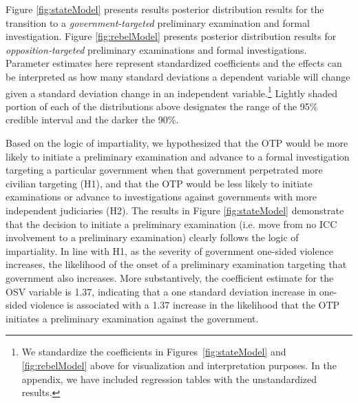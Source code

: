 Figure \ref{fig:stateModel} presents results posterior distribution results for the transition to a \textit{government-targeted} preliminary examination and formal investigation. Figure \ref{fig:rebelModel} presents posterior distribution results for \textit{opposition-targeted} preliminary examinations and formal investigations. Parameter estimates here represent standardized coefficients and the effects can be interpreted as how many standard deviations a dependent variable will change given a standard deviation change in an independent variable.\footnote{We standardize the coefficients in Figures~\ref{fig:stateModel} and \ref{fig:rebelModel} above for visualization and interpretation purposes. In the appendix, we have included regression tables with the unstandardized results.} Lightly shaded portion of each of the distributions above designates the range of the 95\% credible interval and the darker the 90\%.

Based on the logic of impartiality, we hypothesized that the OTP would be more likely to initiate a preliminary examination and advance to a formal investigation targeting a particular government when that government perpetrated more civilian targeting (H1), and that the OTP would be less likely to initiate examinations or advance to investigations against governments with more independent judiciaries (H2). The results in Figure \ref{fig:stateModel} demonstrate that the decision to initiate a preliminary examination (i.e. move from no ICC involvement to a preliminary examination) clearly follows the logic of impartiality. In line with H1, as the severity of government one-sided violence increases, the likelihood of the onset of a preliminary examination targeting that government also increases.  More substantively, the coefficient estimate for the OSV variable is 1.37, indicating that a one standard deviation increase in one-sided violence is associated with a 1.37 increase in the likelihood that the OTP initiates a preliminary examination against the government.

